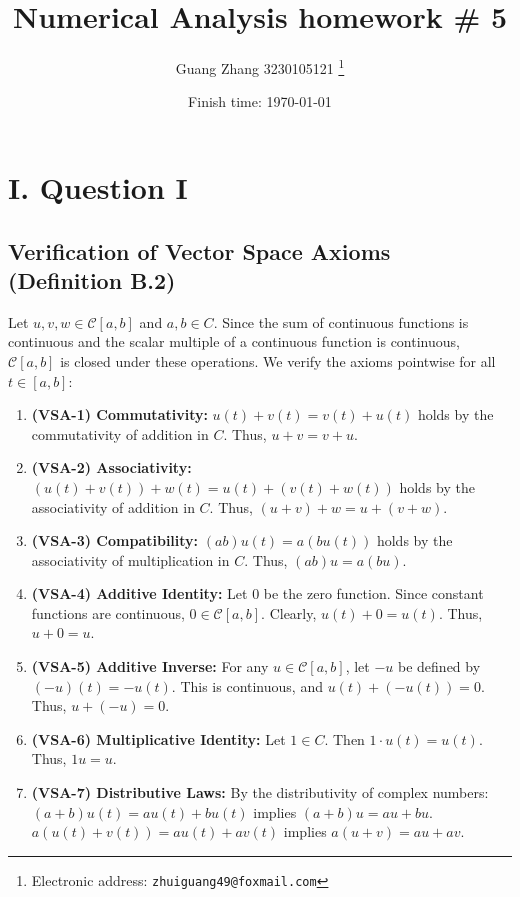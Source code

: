 \documentclass[a4paper]{article}
\begin{document}
\title{Numerical Analysis homework \# 5}

\author{Guang Zhang 3230105121
  \thanks{Electronic address: \texttt{zhuiguang49@foxmail.com}}}

\date{Finish time: \today}

\maketitle


\section*{I. Question I}

\subsection*{Verification of Vector Space Axioms (Definition B.2)}
Let $u, v, w \in \mathcal{C}[a,b]$ and $a, b \in {C}$. Since the sum of continuous functions is continuous and the scalar multiple of a continuous function is continuous, $\mathcal{C}[a,b]$ is closed under these operations. We verify the axioms pointwise for all $t \in [a,b]$:

\begin{enumerate}
    \item \textbf{(VSA-1) Commutativity:}
    $u(t) + v(t) = v(t) + u(t)$ holds by the commutativity of addition in ${C}$. Thus, ${u} +  {v} = {v} + {u}$.

    \item \textbf{(VSA-2) Associativity:}
    $(u(t) + v(t)) + w(t) = u(t) + (v(t) + w(t))$ holds by the associativity of addition in ${C}$. Thus, $({u} + {v}) + {w} = {u} + ({v} + {w})$.

    \item \textbf{(VSA-3) Compatibility:}
    $(ab)u(t) = a(bu(t))$ holds by the associativity of multiplication in ${C}$. Thus, $(ab){u} = a(b{u})$.

    \item \textbf{(VSA-4) Additive Identity:}
    Let ${0}$ be the zero function. Since constant functions are continuous, ${0} \in \mathcal{C}[a,b]$. Clearly, $u(t) + 0 = u(t)$. Thus, ${u} + {0} = {u}$.

    \item \textbf{(VSA-5) Additive Inverse:}
    For any $u \in \mathcal{C}[a,b]$, let $-u$ be defined by $(-u)(t) = -u(t)$. This is continuous, and $u(t) + (-u(t)) = 0$. Thus, ${u} + (-{u}) = {0}$.

    \item \textbf{(VSA-6) Multiplicative Identity:}
    Let $1 \in {C}$. Then $1 \cdot u(t) = u(t)$. Thus, $1{u} = {u}$.

    \item \textbf{(VSA-7) Distributive Laws:}
    By the distributivity of complex numbers:
    $(a+b)u(t) = au(t) + bu(t)$ implies $(a+b){u} = a{u} + b{u}$.
    $a(u(t) + v(t)) = au(t) + av(t)$ implies $a({u} + {v}) = a{u} + a{v}$.
\end{enumerate}
\end{document}
